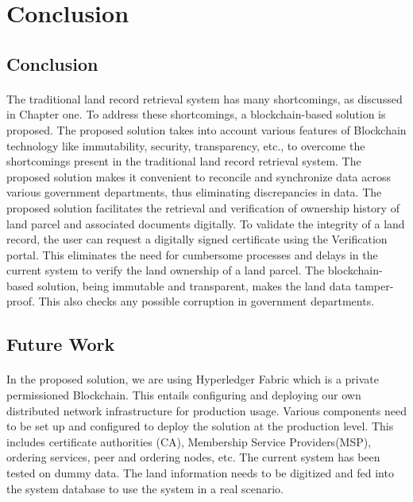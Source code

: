 \documentclass[12pt]{article}
\begin{document}
    \section{Conclusion}
        \subsection{Conclusion}
            \paragraph{}
            The traditional land record retrieval system has many shortcomings, as discussed in Chapter one. To address these shortcomings, a blockchain-based solution is proposed. The proposed solution takes into account various features of Blockchain technology like immutability, security, transparency, etc., to overcome the shortcomings present in the traditional land record retrieval system. The proposed solution makes it convenient to reconcile and synchronize data across various government departments, thus eliminating discrepancies in data. The proposed solution facilitates the retrieval and verification of ownership history of land parcel and associated documents digitally. To validate the integrity of a land record, the user can request a digitally signed certificate using the Verification portal. This eliminates the need for cumbersome processes and delays in the current system to verify the land ownership of a land parcel. The blockchain-based solution, being immutable and transparent, makes the land data tamper-proof. This also checks any possible corruption in government departments.
        
        \subsection{Future Work}
            \paragraph{}
            In the proposed solution, we are using Hyperledger Fabric \cite{fabric} which is a private permissioned Blockchain. This entails configuring and deploying our own distributed network infrastructure for production usage. Various components need to be set up and configured to deploy the solution at the production level. This includes certificate authorities (CA), Membership Service Providers(MSP), ordering services, peer and ordering nodes, etc. The current system has been tested on dummy data. The land information needs to be digitized and fed into the system database to use the system in a real scenario. 
            
\end{document}
